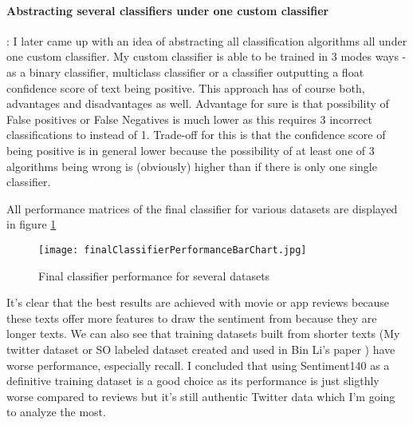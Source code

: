 \paragraph{Abstracting several classifiers under one custom classifier}:
I later came up with an idea of abstracting all classification algorithms all under one custom classifier. My custom classifier is able to be trained in 3 modes ways - as a binary classifier, multiclass classifier or a classifier outputting a float confidence score of text being positive.
This approach has of course both, advantages and disadvantages as well. Advantage for sure is that possibility of False positives or False Negatives is much lower as this requires 3 incorrect classifications to instead of 1. Trade-off for this is that the confidence score of being positive is in general lower because the possibility of at least one of 3 algorithms being wrong is (obviously) higher than if there is only one single classifier.

All performance matrices of the final classifier for various datasets are displayed in figure \ref{fig:finalClassifierPerformanceBarChart}


\begin{figure}[H]%
    \centering
	\texttt{[image: finalClassifierPerformanceBarChart.jpg]}
    \caption{Final classifier performance for several datasets}%
    \label{fig:finalClassifierPerformanceBarChart}%
\end{figure}

It's clear that the best results are achieved with movie or app reviews because these texts offer more features to draw the sentiment from because they are longer texts. We can also see that training datasets built from shorter texts (My twitter dataset or SO labeled dataset created and used in Bin Li's paper ) have worse performance, especially recall. I concluded that using Sentiment140 as a definitive training dataset is a good choice as its performance is just sligthly worse compared to reviews but it's still authentic Twitter data which I'm going to analyze the most.